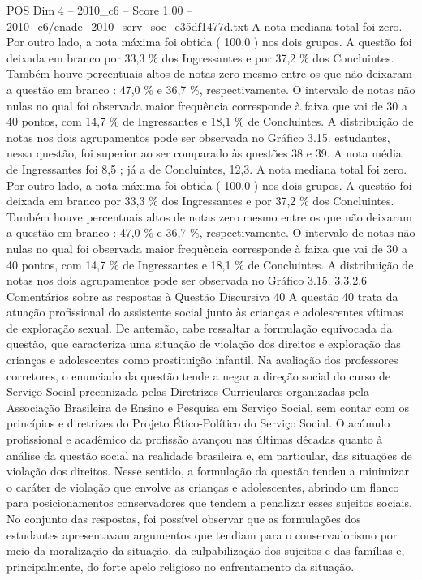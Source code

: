 \begin{textsample}{POS Dim 4 – 2010\_c6 – Score 1.00 – 2010\_c6/enade\_2010\_serv\_soc\_e35df1477d.txt}
A nota mediana total foi zero.
Por outro lado, a nota máxima foi obtida ( 100,0 ) nos dois grupos.
A questão foi deixada em branco por 33,3 \% dos Ingressantes e por 37,2 \% dos Concluintes.
Também houve percentuais altos de notas zero mesmo entre os que não deixaram a questão em branco : 47,0 \% e 36,7 \%, respectivamente.
O intervalo de notas não nulas no qual foi observada maior frequência corresponde à faixa que vai de 30 a 40 pontos, com 14,7 \% de Ingressantes e 18,1 \% de Concluintes.
A distribuição de notas nos dois agrupamentos pode ser observada no Gráfico 3.15. estudantes, nessa questão, foi superior ao ser comparado às questões 38 e 39.
A nota média de Ingressantes foi 8,5 ; já a de Concluintes, 12,3.
A nota mediana total foi zero.
Por outro lado, a nota máxima foi obtida ( 100,0 ) nos dois grupos.
A questão foi deixada em branco por 33,3 \% dos Ingressantes e por 37,2 \% dos Concluintes.
Também houve percentuais altos de notas zero mesmo entre os que não deixaram a questão em branco : 47,0 \% e 36,7 \%, respectivamente.
O intervalo de notas não nulas no qual foi observada maior frequência corresponde à faixa que vai de 30 a 40 pontos, com 14,7 \% de Ingressantes e 18,1 \% de Concluintes.
A distribuição de notas nos dois agrupamentos pode ser observada no Gráfico 3.15. 3.3.2.6 Comentários sobre as respostas à Questão Discursiva 40 A questão 40 trata da atuação profissional do assistente social junto às crianças e adolescentes vítimas de exploração sexual.
De antemão, cabe ressaltar a formulação equivocada da questão, que caracteriza uma situação de violação dos direitos e exploração das crianças e adolescentes como prostituição infantil.
Na avaliação dos professores corretores, o enunciado da questão tende a negar a direção social do curso de Serviço Social preconizada pelas Diretrizes Curriculares organizadas pela Associação Brasileira de Ensino e Pesquisa em Serviço Social, sem contar com os princípios e diretrizes do Projeto Ético-Político do Serviço Social.
O acúmulo profissional e acadêmico da profissão avançou nas últimas décadas quanto à análise da questão social na realidade brasileira e, em particular, das situações de violação dos direitos.
Nesse sentido, a formulação da questão tendeu a minimizar o caráter de violação que envolve as crianças e adolescentes, abrindo um flanco para posicionamentos conservadores que tendem a penalizar esses sujeitos sociais.
No conjunto das respostas, foi possível observar que as formulações dos estudantes apresentavam argumentos que tendiam para o conservadorismo por meio da moralização da situação, da culpabilização dos sujeitos e das famílias e, principalmente, do forte apelo religioso no enfrentamento da situação.

\end{textsample}
